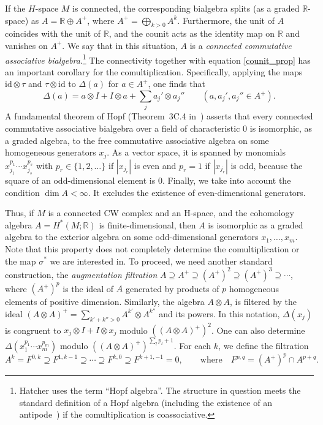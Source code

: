 \documentclass[12pt]{article}
\newcommand{\RR}{\mathbb{R}}
\newcommand{\id}{\mathrm{id}}
\newtheorem[definition]{Definition}[Theorem]{Definition}
\newtheorem[remark]{Example}[Theorem]{Example}
\newtheorem[remark]{Remark}[Theorem]{Remark}
\newtheorem[remark]{Question}[Theorem]{Open question}
\newtheorem*[definition]{definition}{Definition}
\newtheorem*[remark]{example}{Example}
\newtheorem*[remark]{remark}{Remark}
\newtheorem*[remark]{question}{Open question}
\numberwithin{equation}{section}
\begin{document}
If the $H$-space $M$ is connected, the corresponding bialgebra splits (as a graded $\RR$-space) as $A=\RR\oplus A^+$, where $A^+=\bigoplus_{k>0}A^k$. Furthermore, the unit of $A$ coincides with the unit of $\RR$, and the counit acts as the identity map on $\RR$ and vanishes on $A^+$. We say that in this situation, $A$ is a \emph{connected commutative associative bialgebra}.\footnote{Hatcher \cite[section~3.C]{Hat-at} uses the term ``Hopf algebra''. The structure in question meets the standard definition of a Hopf algebra (including the existence of an antipode~\cite{MiMo65}) if the comultiplication is coassociative.} The connectivity together with equation \eqref{counit_prop} has an important corollary for the comultiplication. Specifically, applying the maps $\id\otimes\tau$ and $\tau\otimes\id$ to $\Delta(a)$ for $a\in A^+$, one finds that
\begin{equation}\label{comult_structure}
\Delta(a)=a\otimes I+I\otimes a+\sum_{j}a_j'\otimes a_j''\qquad
(a,a_j',a_j''\in A^+).
\end{equation}
A fundamental theorem of Hopf (Theorem~3C.4 in~\cite{Hat-at}) asserts that every connected commutative associative bialgebra over a field of characteristic $0$ is isomorphic, as a graded algebra, to the free commutative associative algebra on some homogeneous generators $x_j$. As a vector space, it is spanned by monomials $x_{j_1}^{p_1}\cdots x_{j_s}^{p_s}$ with $p_r\in\{1,2,\ldots\}$ if $|x_{j_r}|$ is even and $p_r=1$ if $|x_{j_r}|$ is odd, because the square of an odd-dimensional element is $0$. Finally, we take into account the condition $\dim A<\infty$. It excludes the existence of even-dimensional generators. 

Thus, if $M$ is a connected CW complex and an H-space, and the cohomology algebra $A=H^*(M;\RR)$ is finite-dimensional, then $A$ is isomorphic as a graded algebra to the exterior algebra on some odd-dimensional generators $x_1,\dots,x_m$. Note that this property does not completely determine the comultiplication or the map $\sigma^*$ we are interested in. To proceed, we need another standard construction, the \emph{augmentation filtration} $A\supseteq A^+\supseteq  (A^+)^2\supseteq  (A^+)^3\supseteq\cdots$, where $(A^+)^p$ is the ideal of $A$ generated by products of $p$ homogeneous elements of positive dimension. Similarly, the algebra $A\otimes A$, is filtered by the ideal $(A\otimes A)^+=\sum_{k'+k''>0}A^{k'}\otimes A^{k''}$ and its powers. In this notation, $\Delta(x_j)$ is congruent to $x_j\otimes I+I\otimes x_j$ modulo $((A\otimes A)^+)^2$. One can also determine $\Delta(x_1^{p_1}\cdots x_m^{p_m})$ modulo $((A\otimes A)^+)^{\sum_lp_l+1}$. For each $k$, we define the filtration
\begin{equation}\label{aug_filtration}
 A^k=F^{0,k}\supseteq F^{1,k-1}\supseteq\cdots\supseteq
F^{k,0}\supseteq F^{k+1,-1}=0,\qquad
\text{where}\quad F^{p,q}=(A^+)^p\cap A^{p+q}.
\end{equation}
\end{document}

